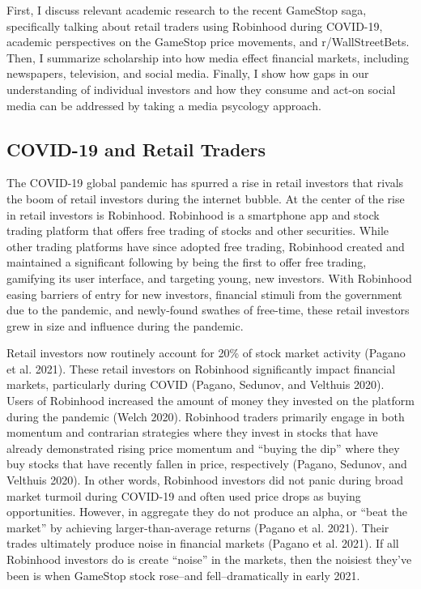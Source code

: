 \documentclass[12pt,]{article}
\begin{document}
First, I discuss relevant academic research to the recent GameStop saga,
specifically talking about retail traders using Robinhood during
COVID-19, academic perspectives on the GameStop price movements, and
r/WallStreetBets. Then, I summarize scholarship into how media effect
financial markets, including newspapers, television, and social media.
Finally, I show how gaps in our understanding of individual investors
and how they consume and act-on social media can be addressed by taking
a media psycology approach.

\hypertarget{covid-19-and-retail-traders}{%
\subsection{COVID-19 and Retail
Traders}\label{covid-19-and-retail-traders}}

The COVID-19 global pandemic has spurred a rise in retail investors that
rivals the boom of retail investors during the internet bubble. At the
center of the rise in retail investors is Robinhood. Robinhood is a
smartphone app and stock trading platform that offers free trading of
stocks and other securities. While other trading platforms have since
adopted free trading, Robinhood created and maintained a significant
following by being the first to offer free trading, gamifying its user
interface, and targeting young, new investors. With Robinhood easing
barriers of entry for new investors, financial stimuli from the
government due to the pandemic, and newly-found swathes of free-time,
these retail investors grew in size and influence during the pandemic.

Retail investors now routinely account for 20\% of stock market activity
(Pagano et al. 2021). These retail investors on Robinhood significantly
impact financial markets, particularly during COVID (Pagano, Sedunov,
and Velthuis 2020). Users of Robinhood increased the amount of money
they invested on the platform during the pandemic (Welch 2020).
Robinhood traders primarily engage in both momentum and contrarian
strategies where they invest in stocks that have already demonstrated
rising price momentum and ``buying the dip'' where they buy stocks that
have recently fallen in price, respectively (Pagano, Sedunov, and
Velthuis 2020). In other words, Robinhood investors did not panic during
broad market turmoil during COVID-19 and often used price drops as
buying opportunities. However, in aggregate they do not produce an
alpha, or ``beat the market'' by achieving larger-than-average returns
(Pagano et al. 2021). Their trades ultimately produce noise in financial
markets (Pagano et al. 2021). If all Robinhood investors do is create
``noise'' in the markets, then the noisiest they've been is when
GameStop stock rose--and fell--dramatically in early 2021.
\end{document}
